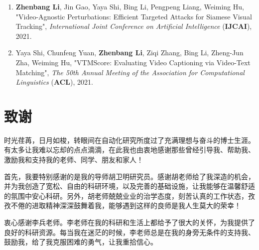 {
\setlist[enumerate]{}%
\begin{enumerate}[nosep]
    \item \textbf{Zhenbang Li}, Jin Gao, Yaya Shi, Bing Li, Pengpeng Liang, Weiming Hu, "Video-Agnostic Perturbations: Efficient Targeted Attacks for Siamese Visual Tracking", \textit{International Joint Conference on Artificial Intelligence} (\textbf{IJCAI}), 2021.
    \item Yaya Shi, Chunfeng Yuan, \textbf{Zhenbang Li}, Ziqi Zhang, Bing Li, Zheng-Jun Zha, Weiming Hu, "VTMScore: Evaluating Video Captioning via Video-Text Matching", \textit{The 50th Annual Meeting of the Association for Computational Linguistics} (\textbf{ACL}), 2021.
\end{enumerate}
}
\iffalse
\section*{申请或已获得的专利:}

(无专利时此项不必列出)

\section*{参加的研究项目及获奖情况:}

可以随意添加新的条目或是结构。
\fi
\chapter[致谢]{致\quad 谢}%
\thispagestyle{noheaderstyle}%

时光荏苒，日月如梭，转眼间在自动化研究所度过了充满理想与奋斗的博士生涯。有太多让我难以忘却的点点滴滴，在此我也由衷地感谢那些曾经引导我、帮助我、激励我和支持我的老师、同学、朋友和家人！

首先，我要特别感谢的是我的导师胡卫明研究员。感谢胡老师给了我深造的机会，并为我创造了宽松、自由的科研环境，以及完善的基础设施，让我能够在温馨舒适的氛围中安心科研。另外，胡老师兢兢业业的治学态度，刻苦认真的工作状态，孜孜不倦的进取精神深深鼓舞着我，能够遇到这样的良师是我人生莫大的荣幸！

衷心感谢李兵老师。李老师在我的科研和生活上都给予了很大的关怀，为我提供了良好的科研资源。每当我在迷茫的时候，李老师总是在我的身旁无条件的支持我、鼓励我，给了我克服困难的勇气，让我重拾信心。

